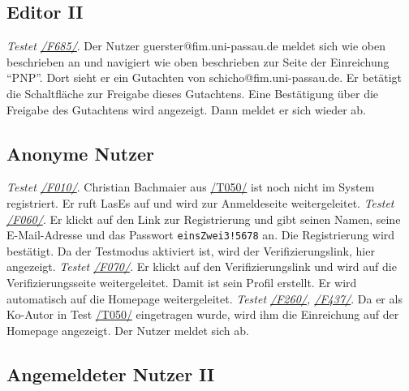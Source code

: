 \subsection{Editor II}
\begin{description}

	 \emph{Testet \hyperref[funkt:685]{/F685/}}.
	Der Nutzer guerster@fim.uni-passau.de meldet sich wie oben beschrieben an und navigiert wie oben beschrieben zur Seite der Einreichung ``P\neq NP''.
	Dort sieht er ein Gutachten von schicho@fim.uni-passau.de.
	Er betätigt die Schaltfläche zur Freigabe dieses Gutachtens.
	Eine Bestätigung über die Freigabe des Gutachtens wird angezeigt.
	Dann meldet er sich wieder ab.

\end{description}

\subsection{Anonyme Nutzer}

\begin{description}
	 \emph{Testet \hyperref[funkt:010]{/F010/}}.
	Christian Bachmaier aus \hyperref[t050]{/T050/} ist noch nicht im System registriert.
	Er ruft LasEs auf und wird zur Anmeldeseite weitergeleitet.
	 \emph{Testet \hyperref[funkt:060]{/F060/}}.
	Er klickt auf den Link zur Registrierung und gibt seinen Namen, seine E-Mail-Adresse und das Passwort \texttt{einsZwei3!5678} an.
	Die Registrierung wird bestätigt.
	Da der Testmodus aktiviert ist, wird der Verifizierungslink, hier angezeigt.
	 \emph{Testet \hyperref[funkt:070]{/F070/}}.
	Er klickt auf den Verifizierungslink und wird auf die Verifizierungsseite weitergeleitet.
	Damit ist sein Profil erstellt.
	Er wird automatisch auf die Homepage weitergeleitet.
	 \emph{Testet \hyperref[funkt:260]{/F260/}, \hyperref[funkt:437]{/F437/}}.
	Da er als Ko-Autor in Test \hyperref[t050]{/T050/} eingetragen wurde, wird ihm die Einreichung auf der Homepage angezeigt.
	Der Nutzer meldet sich ab.
\end{description}

\subsection{Angemeldeter Nutzer II}

